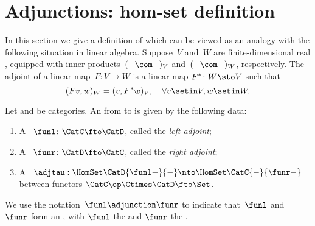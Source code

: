 


\section{Adjunctions:  hom-set definition}
\label{sec:adjunctions-hom-set-definition}
In this section we give a definition of  which can be viewed as an analogy with the following situation in linear algebra.
Suppose~$V$ and~$W$ are finite-dimensional real , equipped with inner products~$(-\com -)_V$ and~$(- \com -)_W$, respectively.
The adjoint of a linear map~$F\colon V \to W$ is a linear map $F^*\colon W \sto V$ such that
\begin{equation}
    (Fv, w)
    _W = (v, F^*w)_V, \quad \forall v \setin V, w \setin W.
\end{equation}

\begin{ctdefinition}
    \label{def:adj-iso}
    \label{def:cat-adjunction-v1}
    Let \CatC and \CatD be categories.
    An  from \CatC to \CatD is given by the following data:
    \begin{enumerate}
        \item A ~$\funl\colon \CatC \fto \CatD$, called the \emph{left adjoint};
        \item A ~$\funr\colon \CatD \fto \CatC$, called the \emph{right adjoint};
        \item A ~$\adjtau: \HomSet\CatD{\funl -}{-} \nto \HomSet\CatC{-}{\funr - }$ between functors $\CatC\op \Ctimes \CatD \fto \Set$. 
    \end{enumerate}
    We use the notation~$\funl \adjunction \funr$ to indicate that~$\funl$ and~$\funr$ form an , with $\funl$ the  and $\funr$ the .
\end{ctdefinition}


